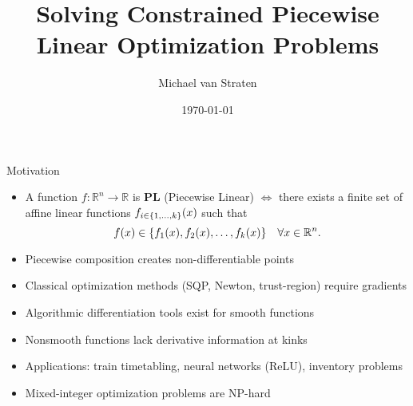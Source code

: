 \documentclass[aspectratio=169]{beamer}
\title{Solving Constrained Piecewise Linear Optimization Problems}
\author{Michael van Straten}
\date{\today}
\institute{Humboldt-Universität zu Berlin}
\DeclarePairedDelimiter{\set}{\lbrace}{\rbrace}
\newcommand{\field}[1]{\mathbb{#1}}
\newcommand{\reals}{\field{R}}
\begin{document}
\NoHyper

\begin{frame}
    \titlepage

\end{frame}

\begin{frame}{Motivation}
    \begin{itemize}[<+->]
        \item A function $f \colon \reals^n \to \reals$ is \textbf{PL}
              (Piecewise Linear) \(\iff\) there exists a finite set of affine
              linear functions $f_{i \in \set{1, \dots, k}}(x)$ such that
              \[
                  f(x) \in \set{f_1(x), f_2(x), \dots, f_k(x)}
                  \quad \forall x \in \reals^n.
              \]
        \item<2-> Piecewise composition creates non-differentiable points
        \item<3-> Classical optimization methods (SQP, Newton, trust-region)
              require gradients
        \item<4-> Algorithmic differentiation tools exist for smooth functions
        \item<5-> Nonsmooth functions lack derivative information at kinks
        \item<6-> Applications: train timetabling, neural networks (ReLU),
              inventory problems
        \item<7-> Mixed-integer optimization problems are NP-hard
    \end{itemize}


\end{frame}
\end{document}

